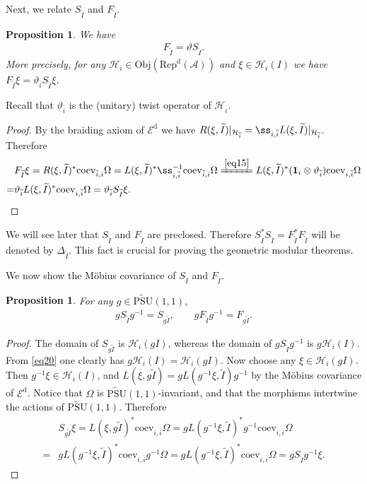 \documentclass[12pt,a4paper]{article}
\theoremstyle{definition}
\theoremstyle{plain}
\newtheorem{pp}[df]{Proposition}
\newcommand{\mc}{\mathcal}
\newcommand{\wtd}{\widetilde}
\newcommand{\ovl}{\overline}
\newcommand{\id}{\mathbf{1}}
\newcommand{\coev}{\mathrm{coev}}
\newcommand{\UPSU}{\widetilde{\mathrm{PSU}}(1,1)}
\newcommand{\RepdA}{\mathrm{Rep}^{\mathrm d}(\mc A)}
\newcommand{\Obj}{\mathrm{Obj}}
\newcommand{\Ed}{\mathscr E^{\mathrm d}}
\numberwithin{equation}{section}
\begin{document}
Next, we relate $S_{\wtd I}$ and $F_{\wtd I}$. 

\begin{pp}\label{lb28}
We have
\begin{align}
F_{\wtd I}=\vartheta S_{\wtd I}.
\end{align}
More precisely, for any $\mc H_i\in\Obj(\RepdA)$ and $\xi\in\mc H_i(I)$ we have $F_{\wtd I}\xi=\vartheta_{\ovl i}S_{\wtd I}\xi$.
\end{pp}
Recall that $\vartheta_{\ovl i}$ is the (unitary) twist operator of $\mc H_{\ovl i}$.
\begin{proof}
By the braiding axiom of $\Ed$ we have $R(\xi,\wtd I)|_{\mc H_{\ovl i}}=\ss_{i,\ovl i}L(\xi,\wtd I)|_{\mc H_{\ovl i}}$. Therefore
\begin{align*}
&F_{\wtd I}\xi=R(\xi,\wtd I)^*\coev_{\ovl i,i}\Omega=L(\xi,\wtd I)^*\ss_{i,\ovl i}^{-1}\coev_{\ovl i,i}\Omega \xlongequal{\eqref{eq15}} L(\xi,\wtd I)^*(\id_i\otimes\vartheta_{\ovl i})\coev_{i,\ovl i}\Omega\\
=&\vartheta_{\ovl i}L(\xi,\wtd I)^*\coev_{i,\ovl i}\Omega=\vartheta_{\ovl i}S_{\wtd I}\xi.
\end{align*}
\end{proof}

We will see later that $S_{\wtd I}$ and $F_{\wtd I}$ are preclosed. Therefore $S_{\wtd I}^*S_{\wtd I}=F_{\wtd I}^*F_{\wtd I}$ will be denoted by $\Delta_{\wtd I}$. This fact is  crucial for proving the geometric modular theorems. 

We now show the M\"obius covariance of $S_{\wtd I}$ and $F_{\wtd I}$.

\begin{pp}\label{lb12}
For any $g\in\UPSU$,
\begin{align}
gS_{\wtd I}g^{-1}=S_{g\wtd I},\qquad gF_{\wtd I}g^{-1}=F_{g\wtd I}.
\end{align}	
\end{pp}	
\begin{proof}
The domain of $S_{g\wtd I}$ is $\mc H_i(gI)$, whereas the domain of $gS_{\wtd I}g^{-1}$ is $g\mc H_i(I)$. From \eqref{eq20} one clearly has $g\mc H_i(I)=\mc H_i(gI)$. Now choose any $\xi\in\mc H_i(gI)$. Then $g^{-1}\xi\in\mc H_i(I)$, and $L(\xi,g\wtd I)=gL(g^{-1}\xi,\wtd I)g^{-1}$ by the M\"obius covariance of $\Ed$. Notice that $\Omega$ is $\UPSU$-invariant, and that the morphisms intertwine the actions of $\UPSU$. Therefore
\begin{align*}
&S_{g\wtd I}\xi=L(\xi,g\wtd I)^*\coev_{i,\ovl i}\Omega=gL(g^{-1}\xi,\wtd I)^*g^{-1}\coev_{i,\ovl i}\Omega\\
=&gL(g^{-1}\xi,\wtd I)^*\coev_{i,\ovl i}g^{-1}\Omega=gL(g^{-1}\xi,\wtd I)^*\coev_{i,\ovl i}\Omega=gS_{\wtd I}g^{-1}\xi.
\end{align*}
\end{proof}
\end{document}
